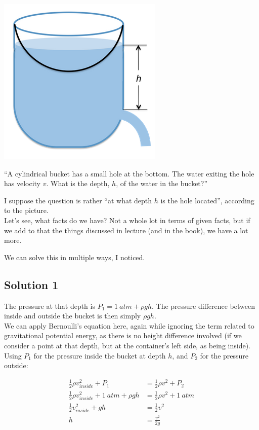 \documentclass[8.01x]{subfiles}
\begin{document}
\begin{center}
\includegraphics[scale=0.6]{Graphics/h10p6}
\end{center}

``A cylindrical bucket has a small hole at the bottom. The water exiting the hole has velocity $v$. What is the depth, $h$, of the water in the bucket?''

I suppose the question is rather ``at what depth $h$ is the hole located'', according to the picture.\\
Let's see, what facts do we have? Not a whole lot in terms of given facts, but if we add to that the things discussed in lecture (and in the book), we have a lot more.

We can solve this in multiple ways, I noticed.

\subsection{Solution 1}

The pressure at that depth is $P_1 = \SI{1}{atm} + \rho g h$. The pressure difference between inside and outside the bucket is then simply $\rho g h$.\\
We can apply Bernoulli's equation here, again while ignoring the term related to gravitational potential energy, as there is no height difference involved (if we consider a point at that depth, but at the container's left side, as being inside). Using $P_1$ for the pressure inside the bucket at depth $h$, and $P_2$ for the pressure outside:

\begin{align}
\frac{1}{2} \rho v_{inside}^2 + P_1 &= \frac{1}{2} \rho v^2 + P_2\\
\frac{1}{2} \rho v_{inside}^2 + \SI{1}{atm} + \rho g h &= \frac{1}{2} \rho v^2 + \SI{1}{atm}\\
\frac{1}{2} v_{inside}^2 + g h &= \frac{1}{2} v^2\\
h &= \frac{v^2}{2g}
\end{align}
\end{document}
